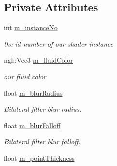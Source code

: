 \subsection*{Private Attributes}
\begin{DoxyCompactItemize}
\item 
\hypertarget{class_fluid_shader_ac5d0650a0b155d50a85c71a97fa92494}{int \hyperlink{class_fluid_shader_ac5d0650a0b155d50a85c71a97fa92494}{m\-\_\-instance\-No}}\label{class_fluid_shader_ac5d0650a0b155d50a85c71a97fa92494}

\begin{DoxyCompactList}\small\item\em the id number of our shader instance \end{DoxyCompactList}\item 
\hypertarget{class_fluid_shader_a33b99afb36290dd90bc54c48b0a88ba4}{ngl\-::\-Vec3 \hyperlink{class_fluid_shader_a33b99afb36290dd90bc54c48b0a88ba4}{m\-\_\-fluid\-Color}}\label{class_fluid_shader_a33b99afb36290dd90bc54c48b0a88ba4}

\begin{DoxyCompactList}\small\item\em our fluid color \end{DoxyCompactList}\item 
\hypertarget{class_fluid_shader_a67b0f8349a22d7ed52f6f2081a4871d1}{float \hyperlink{class_fluid_shader_a67b0f8349a22d7ed52f6f2081a4871d1}{m\-\_\-blur\-Radius}}\label{class_fluid_shader_a67b0f8349a22d7ed52f6f2081a4871d1}

\begin{DoxyCompactList}\small\item\em Bilateral filter blur radius. \end{DoxyCompactList}\item 
\hypertarget{class_fluid_shader_afb00e888a3e963d94d06dd49132e3e42}{float \hyperlink{class_fluid_shader_afb00e888a3e963d94d06dd49132e3e42}{m\-\_\-blur\-Falloff}}\label{class_fluid_shader_afb00e888a3e963d94d06dd49132e3e42}

\begin{DoxyCompactList}\small\item\em Bilateral filter blur falloff. \end{DoxyCompactList}\item 
\hypertarget{class_fluid_shader_ac286b2c5dcc2c68ae69e87f74a4c1efa}{float \hyperlink{class_fluid_shader_ac286b2c5dcc2c68ae69e87f74a4c1efa}{m\-\_\-point\-Thickness}}\label{class_fluid_shader_ac286b2c5dcc2c68ae69e87f74a4c1efa}


\end{DoxyCompactItemize}
